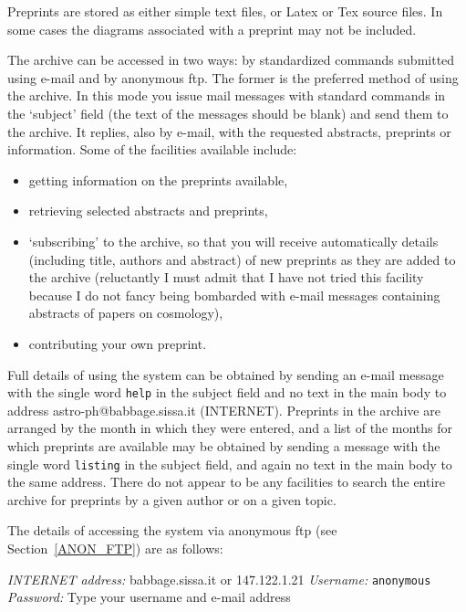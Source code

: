 \documentclass[twoside,11pt,nolof]{starlink}
\begin{document}
Preprints are stored as either simple text files, or Latex or Tex
source files. In some cases the diagrams associated with a preprint
may not be included.

The archive can be accessed in two ways: by standardized commands
submitted using e-mail and by anonymous ftp. The former is the
preferred method of using the archive. In this mode you issue mail
messages with standard commands in the `subject' field (the text of
the messages should be blank) and send them to the archive. It replies,
also by e-mail, with the requested abstracts, preprints or
information. Some of the facilities available include:

\begin{itemize}

  \item getting information on the preprints available,

  \item retrieving selected abstracts and preprints,

  \item `subscribing' to the archive, so that you will receive
   automatically details (including title, authors and abstract) of new
   preprints as they are added to the archive (reluctantly I must admit
   that I have not tried this facility because I do not fancy being
   bombarded with e-mail messages containing abstracts of papers on
   cosmology),

  \item contributing your own preprint.

\end{itemize}

Full details of using the system can be obtained by sending an e-mail
message with the single word \texttt{help} in the subject field and no
text in the main body to address astro-ph@babbage.sissa.it (INTERNET).
Preprints in the archive are arranged by the month in which they were
entered, and a list of the months for which preprints are available may
be obtained by sending a message with the single word \texttt{listing} in
the subject field, and again no text in the main body to the same
address. There do not appear to be any facilities to search the entire
archive for preprints by a given author or on a given topic.

The details of accessing the system via anonymous ftp (see
Section~\ref{ANON_FTP}) are as follows:

\textit{INTERNET address: } babbage.sissa.it or 147.122.1.21
\newline \textit{Username:} \verb-anonymous-
\newline \textit{Password:} Type your username and e-mail address
\end{document}
